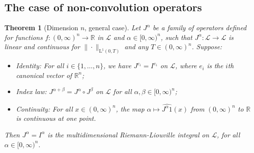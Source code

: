 \documentclass[12pt,reqno]{amsart}
\theoremstyle{plain}
\newtheorem{theorem}{Theorem}[section] %
\numberwithin{equation}{section} %
\begin{document}
\subsection{The case of non-convolution operators} \label{subs_no_lin2}

\begin{theorem}[Dimension $n$, general case] \label{thn_g}
Let $J^\alpha$ be a family of operators defined for functions $f:(0,\infty)^n\rightarrow\mathbb{R}$ in $\mathcal{L}$ and $\alpha\in [0,\infty)^n$, such that $J^\alpha:\mathcal{L}\rightarrow \mathcal{L}$ is linear and continuous for $\|\cdot\|_{\mathrm{L}^1(0,T)}$ and any $T\in (0,\infty)^n$. Suppose: 
\begin{itemize}
\item Identity: For all $i\in\{1,\ldots,n\}$, we have $J^{e_i}=I^{e_i}$ on $\mathcal{L}$, where $e_i$ is the $i$th canonical vector of $\mathbb{R}^n$;
\item Index law: $J^{\alpha+\beta}=J^\alpha\circ J^\beta$  on $\mathcal{L}$ for all $\alpha,\beta\in [0,\infty)^n$; 
\item Continuity: For all $x\in (0,\infty)^n$, the map $\alpha\mapsto \widehat{J^{\alpha}1}(x)$ from $(0,\infty)^n$ to $\mathbb{R}$ is continuous at one point.
\end{itemize}
Then $J^\alpha=I^\alpha$ is the multidimensional Riemann-Liouville integral on $\mathcal{L}$, for all $\alpha\in [0,\infty)^n$. 
\end{theorem}
\end{document}
